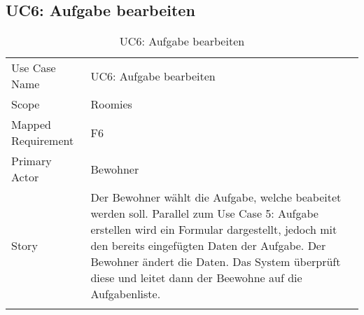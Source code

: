 \subsection{UC6: Aufgabe bearbeiten}
\begin{table}[H]
	\tablestyle
	\tablealtcolored
	\begin{tabularx}{\textwidth}{lX}
		\tablebody
			Use Case Name &
			UC6: Aufgabe bearbeiten
			\tabularnewline
			Scope &
			Roomies
			\tabularnewline
			Mapped Requirement &
			F6
			\tabularnewline
			Primary Actor &
			Bewohner
			\tabularnewline
			Story &
			Der Bewohner wählt die Aufgabe, welche beabeitet werden soll. Parallel zum Use Case 5: Aufgabe erstellen wird ein Formular dargestellt, jedoch mit den bereits eingefügten Daten der Aufgabe. Der Bewohner ändert die Daten. Das System überprüft diese und leitet dann der Beewohne auf die Aufgabenliste.
			\tabularnewline
		\tableend
	\end{tabularx}
	\caption{UC6: Aufgabe bearbeiten}
\end{table}



